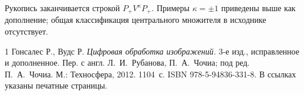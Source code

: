 \documentclass[12pt,a4paper]{article}
\theoremstyle{definition}
\theoremstyle{remark}
\begin{document}
Рукопись заканчивается строкой $P_+V^\kappa P_+$.
Примеры $\kappa=\pm1$ приведены выше как дополнение;
общая классификация центрального множителя в исходнике отсутствует.

\begingroup
\small
\begin{thebibliography}{1}
Гонсалес Р., Вудс Р.
\emph{Цифровая обработка изображений.}
3-е изд., исправленное и дополненное.
Пер. с англ. Л.~И.~Рубанова, П.~А.~Чочиа;
под ред. П.~А.~Чочиа. М.: Техносфера, 2012. 1104~с.
ISBN 978-5-94836-331-8. В ссылках указаны печатные страницы.
\end{thebibliography}
\endgroup
\end{document}
